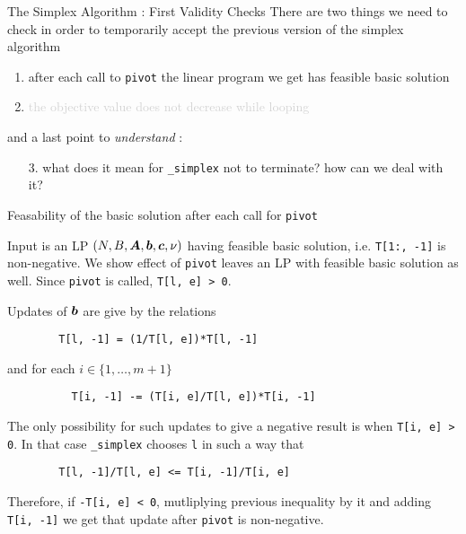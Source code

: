 \documentclass[aspectratio = 169]{beamer}
\begin{document}
\begin{frame}{The Simplex Algorithm : First Validity Checks}
  There are two things we need to check in order to temporarily
  accept the previous version of the simplex algorithm
    \begin{enumerate}
        \item<2->
          after each call to \texttt{pivot} the linear
          program we get has feasible basic solution
        \item<3->
          \textcolor<4->{lightgray}{the objective value does not
            decrease while looping}
    \end{enumerate}
    \pause[5]
    and a last point to \textit{understand} :
    \begin{enumerate}
        \item[3.]
          what does it mean for \texttt{_simplex} not to terminate? how
          can we deal with it?
    \end{enumerate}
\end{frame}

\begin{frame}[fragile]{Feasability of the basic solution after each call for \texttt{pivot}}
    \setlength\columnseprule{.1pt}
    \begin{multicols}{2}
      Input is an LP $(N, B, \boldsymbol{A}, \boldsymbol{b}, \boldsymbol{c}, \nu)$ having
      feasible basic solution, i.e. \texttt{T[1:, -1]} is
      non-negative. We show effect of \texttt{pivot}
      leaves an LP with feasible basic solution as well. Since
      \texttt{pivot} is called, \texttt{T[l, e] > 0}.

      \pause
      Updates of $\boldsymbol{b}$ are give by the relations
      \small{
      \begin{verbatim}
        T[l, -1] = (1/T[l, e])*T[l, -1]
      \end{verbatim}
      }
      and for each $i \in \{1, \ldots, m+1\}$
      \small{
        \begin{verbatim}
          T[i, -1] -= (T[i, e]/T[l, e])*T[i, -1]
        \end{verbatim}
      }
      \pause
      The only possibility for such updates to give a negative result
      is when \texttt{T[i, e] > 0}. In that case
      \texttt{_simplex} chooses \texttt{l} in such a
      way that
      \small{
      \begin{verbatim}
        T[l, -1]/T[l, e] <= T[i, -1]/T[i, e]
      \end{verbatim}
      }
      \pause
      Therefore, if \texttt{-T[i, e] < 0}, mutliplying
      previous inequality by it and adding \texttt{T[i, -1]}
      we get that update after \texttt{pivot} is
      non-negative.
    \end{multicols}
\end{frame}
\end{document}
